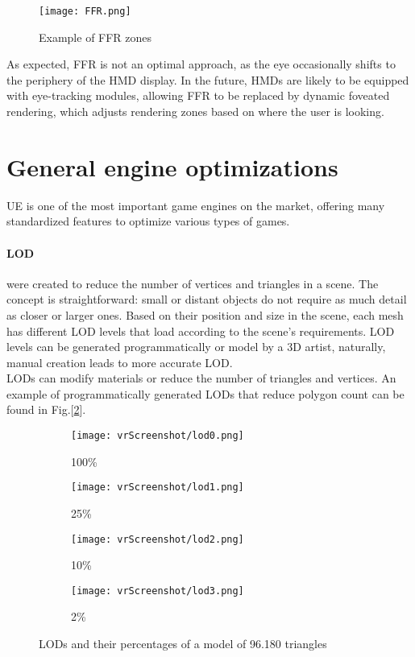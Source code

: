 \begin{figure}[ht]
  \texttt{[image: FFR.png]}
  \caption{Example of FFR zones}
  \label{fig:FFR}
\end{figure}

\noindent
As expected, \ac{FFR} is not an optimal approach, as the eye occasionally shifts to the periphery of the \ac{HMD} display.
In the future, \ac{HMD}s are likely to be equipped with eye-tracking modules, allowing \ac{FFR} to be replaced by dynamic foveated rendering, which adjusts rendering zones based on where the user is looking.

\section{General engine optimizations}
\noindent
\ac{UE} is one of the most important game engines on the market, offering many standardized features to optimize various types of games.

\paragraph{\ac{LOD}}
were created to reduce the number of vertices and triangles in a scene.
The concept is straightforward: small or distant objects do not require as much detail as closer or larger ones. 
Based on their position and size in the scene, each mesh has different \ac{LOD} levels that load according to the scene's requirements.
\ac{LOD} levels can be generated programmatically or model by a 3D artist, naturally, manual creation leads to more accurate \ac{LOD}.\\
\ac{LOD}s can modify materials or reduce the number of triangles and vertices. An example of programmatically generated \ac{LOD}s that reduce polygon count can be found in Fig.[\ref{fig:lods}].

\captionsetup[subfigure]{labelformat=empty}
\begin{figure}[h]
  \centering
  \begin{subfigure}{0.24\textwidth}
      \texttt{[image: vrScreenshot/lod0.png]}
      \caption{100\%}
  \end{subfigure}
  \begin{subfigure}{0.24\textwidth}
      \texttt{[image: vrScreenshot/lod1.png]}
      \caption{25\%}
  \end{subfigure}
  \begin{subfigure}{0.24\textwidth}
      \texttt{[image: vrScreenshot/lod2.png]}
      \caption{10\%}
  \end{subfigure}
  \begin{subfigure}{0.24\textwidth}
      \texttt{[image: vrScreenshot/lod3.png]}
      \caption{2\%}
  \end{subfigure}
  \caption{LODs and their percentages of a model of 96.180 triangles}
  \label{fig:lods}
\end{figure}

